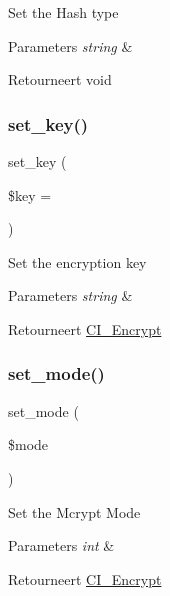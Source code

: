 Set the Hash type


\begin{DoxyParams}{Parameters}
{\em string} & \\
\hline
\end{DoxyParams}
\begin{DoxyReturn}{Retourneert}
void 
\end{DoxyReturn}
\mbox{\label{class_c_i___encrypt_ac8f224ccad805d0bcdf4ab7722058ae2}} 
\subsubsection{\texorpdfstring{set\_key()}{set\_key()}}
{\footnotesize\ttfamily set\+\_\+key (\begin{DoxyParamCaption}\item[{}]{\$key = {\ttfamily \textquotesingle{}\textquotesingle{}} }\end{DoxyParamCaption})}

Set the encryption key


\begin{DoxyParams}{Parameters}
{\em string} & \\
\hline
\end{DoxyParams}
\begin{DoxyReturn}{Retourneert}
\mbox{\hyperlink{class_c_i___encrypt}{C\+I\+\_\+\+Encrypt}} 
\end{DoxyReturn}
\mbox{\label{class_c_i___encrypt_ab32fd90a4ac2df4be1e56460d6f6daa3}} 
\subsubsection{\texorpdfstring{set\_mode()}{set\_mode()}}
{\footnotesize\ttfamily set\+\_\+mode (\begin{DoxyParamCaption}\item[{}]{\$mode }\end{DoxyParamCaption})}

Set the Mcrypt Mode


\begin{DoxyParams}{Parameters}
{\em int} & \\
\hline
\end{DoxyParams}
\begin{DoxyReturn}{Retourneert}
\mbox{\hyperlink{class_c_i___encrypt}{C\+I\+\_\+\+Encrypt}} 
\end{DoxyReturn}
\mbox{\label{class_c_i___encrypt_a4c29a687d4ed62c26a10e41d98930d5f}} 
